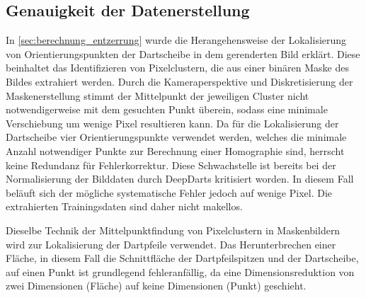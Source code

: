 
\vspace*{-0.2cm}
\subsection{Genauigkeit der Datenerstellung}

In \autoref{sec:berechnung_entzerrung} wurde die Herangehensweise der Lokalisierung von Orientierungspunkten der Dartscheibe in dem gerenderten Bild erklärt. Diese beinhaltet das Identifizieren von Pixelclustern, die aus einer binären Maske des Bildes extrahiert werden. Durch die Kameraperspektive und Diskretisierung der Maskenerstellung stimmt der Mittelpunkt der jeweiligen Cluster nicht notwendigerweise mit dem gesuchten Punkt überein, sodass eine minimale Verschiebung um wenige Pixel resultieren kann. Da für die Lokalisierung der Dartscheibe vier Orientierungspunkte verwendet werden, welches die minimale Anzahl notwendiger Punkte zur Berechnung einer Homographie sind, herrscht keine Redundanz für Fehlerkorrektur. Diese Schwachstelle ist bereits bei der Normalisierung der Bilddaten durch DeepDarts kritisiert worden. In diesem Fall beläuft sich der mögliche systematische Fehler jedoch auf wenige Pixel. Die extrahierten Trainingsdaten sind daher nicht makellos.

Dieselbe Technik der Mittelpunktfindung von Pixelclustern in Maskenbildern wird zur Lokalisierung der Dartpfeile verwendet. Das Herunterbrechen einer Fläche, in diesem Fall die Schnittfläche der Dartpfeilspitzen und der Dartscheibe, auf einen Punkt ist grundlegend fehleranfällig, da eine Dimensionsreduktion von zwei Dimensionen (Fläche) auf keine Dimensionen (Punkt) geschieht.


